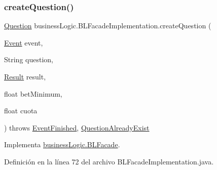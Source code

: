 \subsubsection{\texorpdfstring{createQuestion()}{createQuestion()}\hspace{0.1cm}{\footnotesize\ttfamily [2/2]}}
{\footnotesize\ttfamily \mbox{\hyperlink{classdomain_1_1Question}{Question}} business\+Logic.\+B\+L\+Facade\+Implementation.\+create\+Question (\begin{DoxyParamCaption}\item[{\mbox{\hyperlink{classdomain_1_1Event}{Event}}}]{event,  }\item[{String}]{question,  }\item[{\mbox{\hyperlink{classdomain_1_1Result}{Result}}}]{result,  }\item[{float}]{bet\+Minimum,  }\item[{float}]{cuota }\end{DoxyParamCaption}) throws \mbox{\hyperlink{classexceptions_1_1EventFinished}{Event\+Finished}}, \mbox{\hyperlink{classexceptions_1_1QuestionAlreadyExist}{Question\+Already\+Exist}}}



Implementa \mbox{\hyperlink{interfacebusinessLogic_1_1BLFacade_a7ca4a9726d4132b8e54b6a45a321bec8}{business\+Logic.\+B\+L\+Facade}}.



Definición en la línea 72 del archivo B\+L\+Facade\+Implementation.\+java.


\begin{DoxyCode}{0}

\end{DoxyCode}


